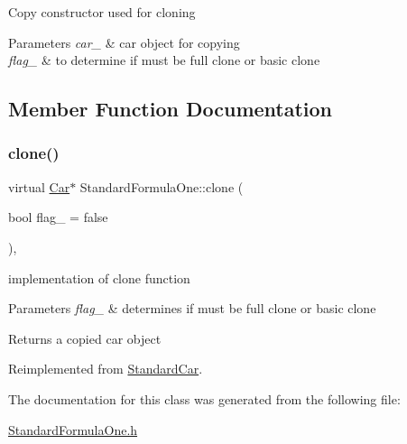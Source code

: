 Copy constructor used for cloning 
\begin{DoxyParams}{Parameters}
{\em car\+\_\+} & car object for copying \\
\hline
{\em flag\+\_\+} & to determine if must be full clone or basic clone \\
\hline
\end{DoxyParams}


\subsection{Member Function Documentation}
\mbox{\label{class_standard_formula_one_acd27c9ec96a7410d40c72666d36b6a7e}} 
\subsubsection{\texorpdfstring{clone()}{clone()}}
{\footnotesize\ttfamily virtual \mbox{\hyperlink{class_car}{Car}}$\ast$ Standard\+Formula\+One\+::clone (\begin{DoxyParamCaption}\item[{bool}]{flag\+\_\+ = {\ttfamily false} }\end{DoxyParamCaption})\hspace{0.3cm}{\ttfamily [inline]}, {\ttfamily [virtual]}}

implementation of clone function 
\begin{DoxyParams}{Parameters}
{\em flag\+\_\+} & determines if must be full clone or basic clone \\
\hline
\end{DoxyParams}
\begin{DoxyReturn}{Returns}
a copied car object 
\end{DoxyReturn}


Reimplemented from \mbox{\hyperlink{class_standard_car_a2fd5dd06bebd68db247bab73bd2176be}{Standard\+Car}}.



The documentation for this class was generated from the following file\+:\begin{DoxyCompactItemize}
\item 
\mbox{\hyperlink{_standard_formula_one_8h}{Standard\+Formula\+One.\+h}}\end{DoxyCompactItemize}

